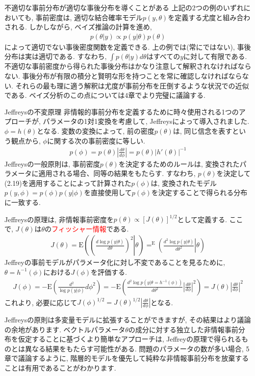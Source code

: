 \documentclass[10pt,dvipdfmx,a4]{beamer}
\newcommand{\eq}[1]{\begin{align}#1\end{align}}
\newcommand{\eqn}[1]{\begin{align*}#1\end{align*}}
\newcommand{\tcr}[1]{\textcolor{red}{#1}}
\begin{document}

\begin{frame}{不適切な事前分布が適切な事後分布を導くことがある}
上記の2つの例のいずれにおいても, 事前密度は, 適切な結合確率モデル$p(y,\theta)$を定義する尤度と組み合わされる.
しかしながら, ベイズ推論の計算を進め,
\eqn{p(\theta|y)\propto p(y|\theta)p(\theta)}
によって適切でない事後密度関数を定義できる.
上の例では(常にではない), 事後分布は実は適切である.
すなわち, $\int p(\theta|y)d\theta$はすべての$y$に対して有限である.
不適切な事前密度から得られた事後分布はかなり注意して解釈されなければならない.
事後分布が有限の積分と賢明な形を持つことを常に確認しなければならない.
それらの最も理に適う解釈は尤度が事前分布を圧倒するような状況での近似である.
ベイズ分析のこの点については4章でより完璧に議論する.
\end{frame}


\begin{frame}{Jeffreysの不変原理}
非情報的事前分布を定義するために時々使用される1つのアプローチが, パラメータの1対1変換を考慮して, Jeffreysによって導入されました.
$\phi=h(\theta)$となる.
変数の変換によって, 前の密度$p(\theta)$は, 同じ信念を表すという観点から, $\phi$に関する次の事前密度に等しい.
\eq{p(\phi)=p(\theta)\left|\frac{d\theta}{d\phi}\right|=p(\theta)|h'(\theta)|^{-1}}
Jeffreysの一般原則は, 事前密度$p(\theta)$を決定するためのルールは, 変換されたパラメータに適用される場合、同等の結果をもたらす.
すなわち, $p(\theta)$を決定して(2.19)を適用することによって計算された$p(\phi)$は, 変換されたモデル$p(y, \phi)=p(\phi)p(y|\phi)$を直接使用して$p(\phi)$を決定することで得られる分布に一致する.
\end{frame}


\begin{frame}
Jeffreysの原理は, 非情報事前密度を$p(\theta)\propto[J(\theta)]^{1/2}$として定義する.
ここで, $J(\theta)$は$\theta$の\tcr{フィッシャー情報}である.
\eq{J(\theta)=\text{E}\left(\left(\left. \frac{d\log p(y|\theta)}{d\theta}\right)^2\right|\theta\right)=^\text{E}\left(\left.\frac{d^2\log p(y|\theta)}{d\theta^2}\right|\theta\right)}
Jeffreyの事前モデルがパラメータ化に対し不変であることを見るために, $\theta=h^{-1}(\phi)$における$J(\phi)$を評価する.
\eqn{J(\phi)=-\text{E}\left(\frac{d^2}{\log p(y|\phi)}{d\phi^2}\right)
=-\text{E}\left(\frac{d^2 \log p(y|\theta=h^{-1}(\phi))}{d\theta^2}\left|\frac{d\theta}{d\phi}\right|^2\right)
=J(\theta)\left|\frac{d\theta}{d\phi}\right|^2}
これより, 必要に応じて$J(\phi)^{1/2}=J(\theta)^{1/2}\left|\frac{d\theta}{d\phi}\right|$となる.

Jeffreysの原則は多変量モデルに拡張することができますが, その結果はより議論の余地があります.
ベクトルパラメータ$\theta$の成分に対する独立した非情報事前分布を仮定することに基づくより簡単なアプローチは, Jeffreyの原理で得られるものとは異なる結果をもたらす可能性がある.
問題のパラメータの数が多い場合, 5章で議論するように, 階層的モデルを優先して純粋な非情報事前分布を放棄することは有用であることがわかります.
\end{frame}
\end{document}
